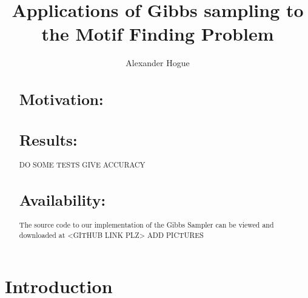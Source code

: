 \documentclass{bioinfo}
\begin{document}
\title[short Title]{Applications of Gibbs sampling to the Motif Finding Problem}
\author[Sample \textit{et~al}]{Alexander Hogue}
\address{}
\history{}
\editor{}

\maketitle

\begin{abstract}

\section{Motivation:}

\section{Results:}
DO SOME TESTS
GIVE ACCURACY

\section{Availability:}
The source code to our implementation of the Gibbs Sampler can be viewed and downloaded at <GITHUB LINK PLZ>
ADD PICTURES
\end{abstract}

\section{Introduction}
\end{document}
